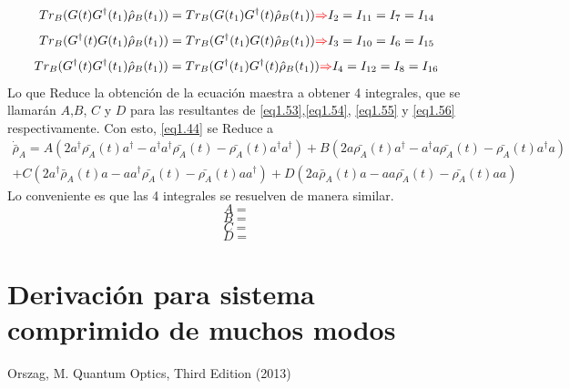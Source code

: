 \documentclass{book}
\begin{document}
 \begin{equation}\label{eq1.54}{Tr_B(G(t)G^\dag(t_1)\hat{\rho}_B(t_1))=Tr_B(G(t_1)G^\dag(t)\hat{\rho}_B(t_1)) \textcolor{red}{\Rightarrow} I_2=I_{11}=I_7=I_{14}}\end{equation}
 \begin{equation}\label{eq1.55}{Tr_B(G^\dag(t)G(t_1)\hat{\rho}_B(t_1))=Tr_B(G^\dag(t_1)G(t)\hat{\rho}_B(t_1)) \textcolor{red}{\Rightarrow} I_3=I_{10}=I_6=I_{15}}\end{equation}
 \begin{equation}\label{eq1.56}{Tr_B(G^\dag(t)G^\dag(t_1)\hat{\rho}_B(t_1))=Tr_B(G^\dag(t_1)G^\dag(t)\hat{\rho}_B(t_1)) \textcolor{red}{\Rightarrow} I_4=I_{12}=I_8=I_{16} }\end{equation}
 Lo que Reduce la obtención de la ecuación maestra a obtener 4 integrales, que se llamarán $A$,$B$, $C$ y $D$ para las resultantes de \textcolor{blue}{\ref{eq1.53}},\textcolor{blue}{\ref{eq1.54}}, \textcolor{blue}{\ref{eq1.55}} y \textcolor{blue}{\ref{eq1.56}} respectivamente.
 Con esto, \textcolor{blue}{\ref{eq1.44}} se Reduce a
 \begin{equation}\label{eq1.57}\begin{aligned}\dot{\bar{\rho}}_A=A(2a^\dag \bar{\rho_A}(t)a^\dag-a^\dag a^\dag\bar{\rho_A}(t)-\bar{\rho_A}(t)a^\dag a^\dag)+B(2a\bar{\rho_A}(t)a^\dag-a^\dag a\bar{\rho_A}(t)-\bar{\rho_A}(t)a^\dag a) \\ +C(2a^\dag \bar{\rho}_A(t)a-aa^\dag\bar{\rho_A}(t)-\bar{\rho_A}(t)a a^\dag)+D(2a \bar{\rho}_A(t)a-a a\bar{\rho_A}(t)-\bar{\rho_A}(t)a a)\end{aligned}\end{equation}
 Lo conveniente es que las 4 integrales se resuelven de manera similar.
\begin{equation}\label{eq1.58}{ A= }\end{equation}
\begin{equation}\label{eq1.59}{ B= }\end{equation}
\begin{equation}\label{eq1.60}{ C= }\end{equation}
\begin{equation}\label{eq1.61}{ D= }\end{equation}


\section{Derivación para sistema comprimido de muchos modos}
\begin{thebibliography}{9}
 Orszag, M. Quantum Optics, Third Edition (2013)
\end{thebibliography}
\end{document}
